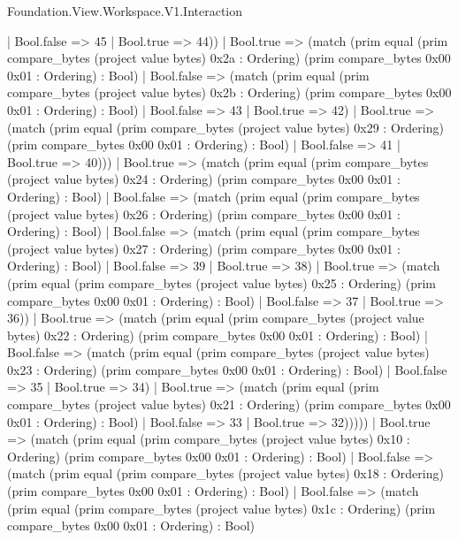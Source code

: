 \begin{lexlean}{Foundation.View.Workspace.V1.Interaction}
\begin{semanticmodule}
{                    | Bool.false => 45
                    | Bool.true => 44))
                | Bool.true => (match (prim equal (prim compare_bytes (project value bytes) 0x2a : Ordering) (prim compare_bytes 0x00 0x01 : Ordering) : Bool)
                  | Bool.false => (match (prim equal (prim compare_bytes (project value bytes) 0x2b : Ordering) (prim compare_bytes 0x00 0x01 : Ordering) : Bool)
                    | Bool.false => 43
                    | Bool.true => 42)
                  | Bool.true => (match (prim equal (prim compare_bytes (project value bytes) 0x29 : Ordering) (prim compare_bytes 0x00 0x01 : Ordering) : Bool)
                    | Bool.false => 41
                    | Bool.true => 40)))
              | Bool.true => (match (prim equal (prim compare_bytes (project value bytes) 0x24 : Ordering) (prim compare_bytes 0x00 0x01 : Ordering) : Bool)
                | Bool.false => (match (prim equal (prim compare_bytes (project value bytes) 0x26 : Ordering) (prim compare_bytes 0x00 0x01 : Ordering) : Bool)
                  | Bool.false => (match (prim equal (prim compare_bytes (project value bytes) 0x27 : Ordering) (prim compare_bytes 0x00 0x01 : Ordering) : Bool)
                    | Bool.false => 39
                    | Bool.true => 38)
                  | Bool.true => (match (prim equal (prim compare_bytes (project value bytes) 0x25 : Ordering) (prim compare_bytes 0x00 0x01 : Ordering) : Bool)
                    | Bool.false => 37
                    | Bool.true => 36))
                | Bool.true => (match (prim equal (prim compare_bytes (project value bytes) 0x22 : Ordering) (prim compare_bytes 0x00 0x01 : Ordering) : Bool)
                  | Bool.false => (match (prim equal (prim compare_bytes (project value bytes) 0x23 : Ordering) (prim compare_bytes 0x00 0x01 : Ordering) : Bool)
                    | Bool.false => 35
                    | Bool.true => 34)
                  | Bool.true => (match (prim equal (prim compare_bytes (project value bytes) 0x21 : Ordering) (prim compare_bytes 0x00 0x01 : Ordering) : Bool)
                    | Bool.false => 33
                    | Bool.true => 32)))))
          | Bool.true => (match (prim equal (prim compare_bytes (project value bytes) 0x10 : Ordering) (prim compare_bytes 0x00 0x01 : Ordering) : Bool)
            | Bool.false => (match (prim equal (prim compare_bytes (project value bytes) 0x18 : Ordering) (prim compare_bytes 0x00 0x01 : Ordering) : Bool)
              | Bool.false => (match (prim equal (prim compare_bytes (project value bytes) 0x1c : Ordering) (prim compare_bytes 0x00 0x01 : Ordering) : Bool)
}
\end{semanticmodule}
\end{lexlean}
